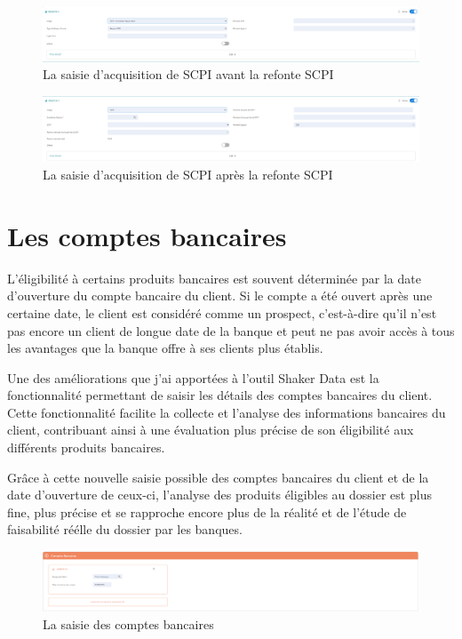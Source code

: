 \documentclass[12pt,oneside,noprintercorrection]{iut}
\begin{document}
 \begin{figure}[!ht]
  \centering
  \includegraphics[width=17cm]{img/projetPageAvant.png}
  \caption{La saisie d'acquisition de SCPI avant la refonte SCPI}
\end{figure}
 \begin{figure}[!ht]
  \centering
  \includegraphics[width=17cm]{img/projetPageApres.png}
  \caption{La saisie d'acquisition de SCPI après la refonte SCPI}
\end{figure}
\clearpage
\clearpage



\section{Les comptes bancaires}
L'éligibilité à certains produits bancaires est souvent déterminée par la date d'ouverture du compte bancaire du client. Si le compte a été ouvert après une certaine date, le client est considéré comme un prospect, c'est-à-dire qu'il n'est pas encore un client de longue date de la banque et peut ne pas avoir accès à tous les avantages que la banque offre à ses clients plus établis.

Une des améliorations que j'ai apportées à l'outil Shaker Data est la fonctionnalité permettant de saisir les détails des comptes bancaires du client. Cette fonctionnalité facilite la collecte et l'analyse des informations bancaires du client, contribuant ainsi à une évaluation plus précise de son éligibilité aux différents produits bancaires.

Grâce à cette nouvelle saisie possible des comptes bancaires du client et de la date d'ouverture de ceux-ci, l'analyse des produits éligibles au dossier est plus fine, plus précise et se rapproche encore plus de la réalité et de l'étude de faisabilité réélle du dossier par les banques.

 \begin{figure}[!ht]
  \centering
  \includegraphics[width=17cm]{img/compteDeBanque.png}
  \caption{La saisie des comptes bancaires}
\end{figure}
\end{document}
